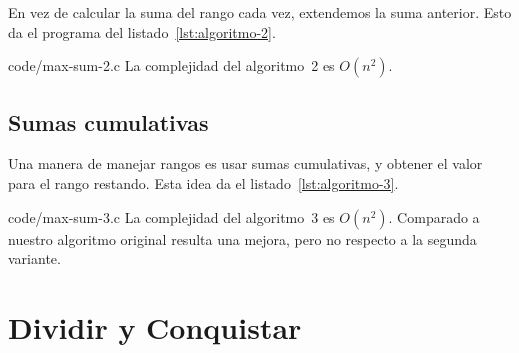   En vez de calcular la suma del rango cada vez,
  extendemos la suma anterior.
  Esto da el programa del listado~\ref{lst:algoritmo-2}.
  
                  {code/max-sum-2.c}
  La complejidad del algoritmo~2 es \(O(n^2)\).

\subsection{Sumas cumulativas}
\label{sec:algoritmo-3}

  Una manera de manejar rangos es usar sumas cumulativas,
  y obtener el valor para el rango restando.
  Esta idea da el listado~\ref{lst:algoritmo-3}.
  
                  {code/max-sum-3.c}
  La complejidad del algoritmo~3 es \(O(n^2)\).
  Comparado a nuestro algoritmo original resulta una mejora,
  pero no respecto a la segunda variante.

\section{Dividir y Conquistar}
\label{sec:algoritmo-4}

